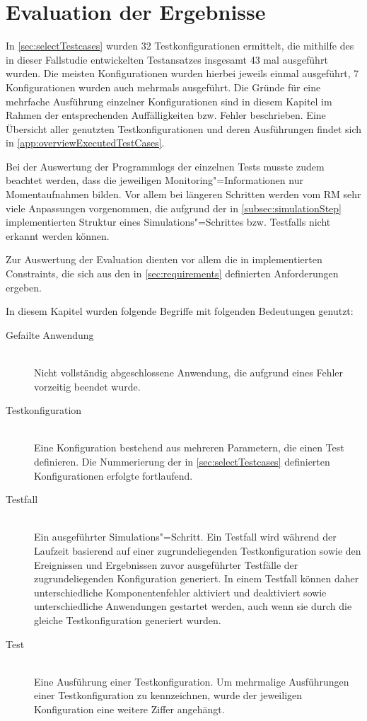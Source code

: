 \chapter{Evaluation der Ergebnisse}
\label{ch:evaluationResults}

In \cref{sec:selectTestcases} wurden 32 Testkonfigurationen ermittelt, die mithilfe des in dieser Fallstudie entwickelten Testansatzes insgesamt 43 mal ausgeführt wurden.
Die meisten Konfigurationen wurden hierbei jeweils einmal ausgeführt, 7 Konfigurationen wurden auch mehrmals ausgeführt.
Die Gründe für eine mehrfache Ausführung einzelner Konfigurationen sind in diesem Kapitel im Rahmen der entsprechenden Auffälligkeiten bzw. Fehler beschrieben.
Eine Übersicht aller genutzten Testkonfigurationen und deren Ausführungen findet sich in \cref{app:overviewExecutedTestCases}.

Bei der Auswertung der Programmlogs der einzelnen Tests musste zudem beachtet werden, dass die jeweiligen Monitoring"=Informationen nur Momentaufnahmen bilden.
Vor allem bei längeren Schritten werden vom \ac{RM} sehr viele Anpassungen vorgenommen, die aufgrund der in \cref{subsec:simulationStep} implementierten Struktur eines Simulations"=Schrittes bzw. Testfalls nicht erkannt werden können.

Zur Auswertung der Evaluation dienten vor allem die in  implementierten Constraints, die sich aus den in \cref{sec:requirements} definierten Anforderungen ergeben.

In diesem Kapitel wurden folgende Begriffe mit folgenden Bedeutungen genutzt:

\begin{description}
    \item [Gefailte Anwendung] \hfill \\
        Nicht vollständig abgeschlossene Anwendung, die aufgrund eines Fehler vorzeitig beendet wurde.
    \item [Testkonfiguration] \hfill \\
        Eine Konfiguration bestehend aus mehreren Parametern, die einen Test definieren.
        Die Nummerierung der in \cref{sec:selectTestcases} definierten Konfigurationen erfolgte fortlaufend.
    \item [Testfall] \hfill \\
        Ein ausgeführter Simulations"=Schritt.
        Ein Testfall wird während der Laufzeit basierend auf einer zugrundeliegenden Testkonfiguration sowie den Ereignissen und Ergebnissen zuvor ausgeführter Testfälle der zugrundeliegenden Konfiguration generiert.
        In einem Testfall können daher unterschiedliche Komponentenfehler aktiviert und deaktiviert sowie unterschiedliche Anwendungen gestartet werden, auch wenn sie durch die gleiche Testkonfiguration generiert wurden.
    \item [Test] \hfill \\
        Eine Ausführung einer Testkonfiguration.
        Um mehrmalige Ausführungen einer Testkonfiguration zu kennzeichnen, wurde der jeweiligen Konfiguration eine weitere Ziffer angehängt.
\end{description}

